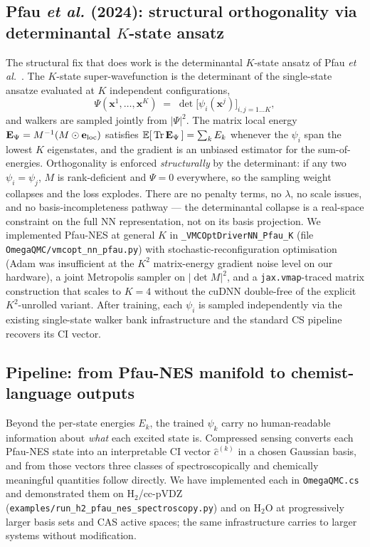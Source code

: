 \documentclass[journal=jctcce,manuscript=suppinfo,layout=traditional]{achemso}
\begin{document}
\subsection{Pfau \emph{et al.} (2024): structural orthogonality via
            determinantal $K$-state ansatz}

The structural fix that does work is the determinantal $K$-state ansatz
of Pfau \emph{et al.}~\cite{Pfau2024ExcitedStates}. The $K$-state
super-wavefunction is the determinant of the single-state ansatze
evaluated at $K$ independent configurations,
\begin{equation}
\Psi(\mathbf{x}^{1},\ldots,\mathbf{x}^{K}) \;=\;
\det\!\bigl[\psi_i(\mathbf{x}^{j})\bigr]_{i,j=1\ldots K},
\label{eq:pfau_super}
\end{equation}
and walkers are sampled jointly from $|\Psi|^{2}$. The matrix local
energy
$\mathbf{E}_\Psi = M^{-1}(M \odot \mathbf{e}_{\rm loc})$ satisfies
$\mathbb{E}[\,{\rm Tr}\,\mathbf{E}_\Psi\,] = \sum_k E_k$ whenever the
$\psi_i$ span the lowest $K$ eigenstates, and the gradient is an
unbiased estimator for the sum-of-energies. Orthogonality is enforced
\emph{structurally} by the determinant: if any two $\psi_i = \psi_j$,
$M$ is rank-deficient and $\Psi = 0$ everywhere, so the sampling
weight collapses and the loss explodes. There are no penalty terms,
no $\lambda$, no scale issues, and no basis-incompleteness pathway
--- the determinantal collapse is a real-space constraint on the full
NN representation, not on its basis projection. We implemented
Pfau-NES at general $K$ in
\texttt{\_VMCOptDriverNN\_Pfau\_K} (file
\texttt{OmegaQMC/vmcopt\_nn\_pfau.py}) with stochastic-reconfiguration
optimisation (Adam was insufficient at the $K^2$ matrix-energy
gradient noise level on our hardware), a joint Metropolis sampler on
$|\det M|^{2}$, and a \texttt{jax.vmap}-traced matrix construction
that scales to $K=4$ without the cuDNN double-free of the explicit
$K^2$-unrolled variant. After training, each $\psi_i$ is sampled
independently via the existing single-state walker bank
infrastructure and the standard CS pipeline recovers its CI vector.

\subsection{Pipeline: from Pfau-NES manifold to chemist-language outputs}

Beyond the per-state energies $E_k$, the trained $\psi_k$ carry no
human-readable information about \emph{what} each excited state is.
Compressed sensing converts each Pfau-NES state into an interpretable
CI vector $\widehat{c}^{(k)}$ in a chosen Gaussian basis, and from
those vectors three classes of spectroscopically and chemically
meaningful quantities follow directly. We have implemented each
in \texttt{OmegaQMC.cs} and demonstrated them on H$_2$/cc-pVDZ
(\texttt{examples/run\_h2\_pfau\_nes\_spectroscopy.py}) and on
H$_2$O at progressively larger basis sets and CAS active spaces; the
same infrastructure carries to larger systems without modification.
\end{document}
